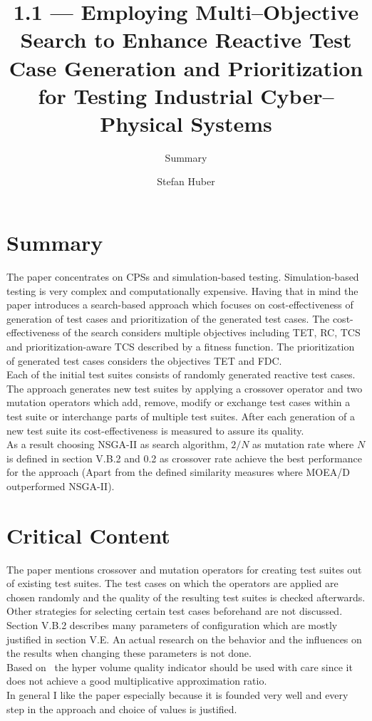 \documentclass[oneside, notitlepage, twocolumn]{scrartcl}
\title{\LARGE 1.1 --- Employing Multi--Objective Search to Enhance Reactive Test Case Generation and Prioritization for Testing Industrial Cyber--Physical Systems}
\subtitle{Summary}
\author{Stefan Huber}
\begin{document}
\maketitle

\section{Summary}
The paper concentrates on \ac{CPS}s and simulation-based testing.
Simulation-based testing is very complex and computationally expensive.
Having that in mind the paper introduces a search-based approach which focuses on cost-effectiveness of generation of test cases and prioritization of the generated test cases.
The cost-effectiveness of the search considers multiple objectives including \ac{TET}, \ac{RC}, \ac{TCS} and prioritization-aware \ac{TCS} described by a fitness function.
The prioritization of generated test cases considers the objectives \ac{TET} and \ac{FDC}.\\
Each of the initial test suites consists of randomly generated reactive test cases.
The approach generates new test suites  by applying a crossover operator and two mutation operators which add, remove, modify or exchange test cases within a test suite or interchange parts of multiple test suites.
After each generation of a new test suite its cost-effectiveness is measured to assure its quality.\\
As a result choosing \ac{NSGA-II} as search algorithm, \(2/N\) as mutation rate where \(N\) is defined in section V.B.2 and 0.2 as crossover rate achieve the best performance for the approach (Apart from the defined similarity measures where \ac{MOEA/D} outperformed \ac{NSGA-II}).

\section{Critical Content}
The paper mentions crossover and mutation operators for creating test suites out of existing test suites.
The test cases on which the operators are applied are chosen randomly and the quality of the resulting test suites is checked afterwards.
Other strategies for selecting certain test cases beforehand are not discussed.\\
Section V.B.2 describes many parameters of configuration which are mostly justified in section V.E.
An actual research on the behavior and the influences on the results when changing these parameters is not done.\\
Based on~\cite{bringmann13} the hyper volume quality indicator should be used with care since it does not achieve a good multiplicative approximation ratio.\\
In general I like the paper especially because it is founded very well and every step in the approach and choice of values is justified.
\end{document}
